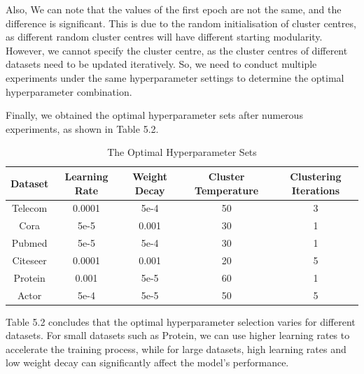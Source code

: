 \documentclass[ %
                    author={Tengyao Tu},
                supervisor={Dr. James Pope},
                    degree={MSc},
                     title={A New Perspective on Graph Community Detection: Combining Traditional Methods with Deep Learning Approaches},
                  subtitle={Applying to Telecom Networks and Diverse Datasets},
                      type={},
                      year={2024}]{dissertation}
\begin{document}
Also, We can note that the values of the first epoch are not the same, and the difference is significant. This is due to the random initialisation of cluster centres, as different random cluster centres will have different starting modularity. However, we cannot specify the cluster centre, as the cluster centres of different datasets need to be updated iteratively. So, we need to conduct multiple experiments under the same hyperparameter settings to determine the optimal hyperparameter combination. 

Finally, we obtained the optimal hyperparameter sets after numerous experiments, as shown in Table 5.2.
\begin{table}[!htbp] 
\centering 
\label{Basic Infomation} 
\caption{The Optimal Hyperparameter Sets} 
\vspace{5pt} 
\begin{tabular}{ccccc} 
\hline 
Dataset &Learning Rate&Weight Decay&Cluster Temperature&Clustering Iterations \\ 
\hline
Telecom& 0.0001&5e-4&50&3\\
Cora& 5e-5&0.001&30&1\\
Pubmed& 5e-5&5e-4&30&1\\
Citeseer& 0.0001&0.001&20&5\\
Protein& 0.001&5e-5&60&1\\
Actor& 5e-4&5e-5&50&5\\
\hline
\end{tabular}
\end{table}
Table 5.2 concludes that the optimal hyperparameter selection varies for different datasets. For small datasets such as Protein, we can use higher learning rates to accelerate the training process, while for large datasets, high learning rates and low weight decay can significantly affect the model's performance.
\end{document}
